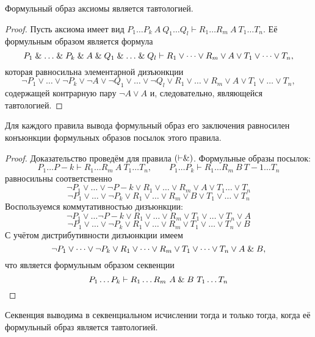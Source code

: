 \begin{theorem}\label{th:axiom}
	Формульный образ аксиомы является тавтологией.
\end{theorem}

\begin{proof}
	Пусть аксиома имеет вид $ P_1 \dots P_k~A~Q_1 \dots Q_l \vdash R_1 \dots R_m~A~T_1 \dots T_n $.
	Её формульным образом является формула
	$$ P_1 \mathrel\& \dots \mathrel\& P_k \mathrel\& A \mathrel\& Q_1 \mathrel\& \dots \mathrel\& Q_l \vdash R_1 \vee \dots \vee R_m \vee A \vee T_1 \vee \dots \vee T_n, $$
	которая равносильна элементарной дизъюнкции
	$$ \neg P_1 \vee \dots \vee \neg P_k \vee \neg A \vee \neg Q_1 \vee \dots \vee \neg Q_l \vee R_1 \vee \dots \vee R_m \vee A \vee T_1 \vee \dots \vee T_n, $$
	содержащей контрарную пару $ \neg A \vee A $ и, следовательно, являющейся тавтологией.
\end{proof}

\begin{theorem}\label{th:infer_rule}
	Для каждого правила вывода формульный образ его заключения равносилен конъюнкции формульных образов посылок этого правила.
\end{theorem}

\begin{proof}
	Доказательство проведём для правила $ (\vdash \mathrel\&) $. Формульные образы посылок:
	$$ P_1 \dots P-k \vdash R_1 \dots R_m ~ A ~ T_1 \dots T_n, \qquad P_1 \dots P_k \vdash R_1 \dots R_m ~ B ~ T-1 \dots T_n $$
	равносильны соответственно
	$$ \neg P_1 \vee \dots \vee \neg P-k \vee R_1 \vee \dots \vee R_m \vee A \vee T_1 \dots \vee T_n $$
	$$ \neg P_1 \vee \dots \vee \neg P_k \vee R_1 \vee \dots \vee R_m \vee B \vee T_1 \vee \dots \vee T_n $$
	Воспользуемся коммутативностью дизъюнкции:
	$$ \neg P_1 \vee \dots \neg P-k \vee R_1 \vee \dots \vee R_m \vee T_1 \vee \dots \vee T_n \vee A $$
	$$ \neg P_1 \vee \dots \vee \neg P_k \vee R_1 \vee \dots \vee R_m \vee T_1 \vee \dots \vee T_n \vee B $$
	С учётом дистрибутивности дизъюнкции имеем
	$$ \neg P_1 \vee \dots \vee \neg P_k \vee R_1 \vee \dots \vee R_m \vee T_1 \vee \dots \vee T_n \vee A \mathrel\& B, $$
	что является формульным образом секвенции
	$$ P_1 \dots P_k \vdash R_1 \dots R_m~A \mathrel\& B ~T_1 \dots T_n $$
\end{proof}

\begin{theorem}
	Секвенция выводима в секвенциальном исчислении тогда и только тогда, когда её формульный образ является тавтологией.
\end{theorem}

